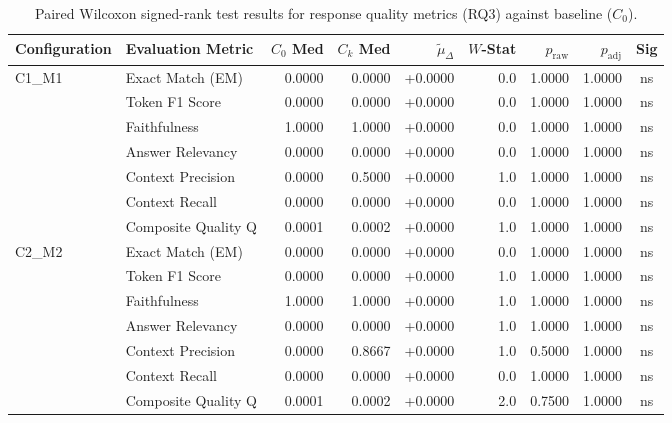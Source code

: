 \begin{table}[p]
\centering
\scriptsize
\setlength{\tabcolsep}{2.4pt}
\renewcommand{\arraystretch}{0.92}
\caption{Paired Wilcoxon signed-rank test results for response quality metrics (RQ3) against baseline ($C_0$).}
\label{tab:wilcoxon_rq3}
\begin{tabular*}{\textwidth}{@{\extracolsep{\fill}} l l r r r r r r c @{}}
\toprule
\textbf{Configuration} & \textbf{Evaluation Metric} & \textbf{$C_0$ Med} & \textbf{$C_k$ Med} & \textbf{$\tilde{\mu}_\Delta$} & \textbf{$W$-Stat} & \textbf{$p_{\text{raw}}$} & \textbf{$p_{\text{adj}}$} & \textbf{Sig} \\
\midrule
C1\_M1          & Exact Match (EM)     & 0.0000 & 0.0000 & +0.0000 & 0.0 & 1.0000 & 1.0000 & ns \\
                & Token F1 Score       & 0.0000 & 0.0000 & +0.0000 & 0.0 & 1.0000 & 1.0000 & ns \\
                & Faithfulness         & 1.0000 & 1.0000 & +0.0000 & 0.0 & 1.0000 & 1.0000 & ns \\
                & Answer Relevancy     & 0.0000 & 0.0000 & +0.0000 & 0.0 & 1.0000 & 1.0000 & ns \\
                & Context Precision    & 0.0000 & 0.5000 & +0.0000 & 1.0 & 1.0000 & 1.0000 & ns \\
                & Context Recall       & 0.0000 & 0.0000 & +0.0000 & 0.0 & 1.0000 & 1.0000 & ns \\
                & Composite Quality Q  & 0.0001 & 0.0002 & +0.0000 & 1.0 & 1.0000 & 1.0000 & ns \\
\addlinespace
C2\_M2          & Exact Match (EM)     & 0.0000 & 0.0000 & +0.0000 & 0.0 & 1.0000 & 1.0000 & ns \\
                & Token F1 Score       & 0.0000 & 0.0000 & +0.0000 & 1.0 & 1.0000 & 1.0000 & ns \\
                & Faithfulness         & 1.0000 & 1.0000 & +0.0000 & 1.0 & 1.0000 & 1.0000 & ns \\
                & Answer Relevancy     & 0.0000 & 0.0000 & +0.0000 & 1.0 & 1.0000 & 1.0000 & ns \\
                & Context Precision    & 0.0000 & 0.8667 & +0.0000 & 1.0 & 0.5000 & 1.0000 & ns \\
                & Context Recall       & 0.0000 & 0.0000 & +0.0000 & 0.0 & 1.0000 & 1.0000 & ns \\
                & Composite Quality Q  & 0.0001 & 0.0002 & +0.0000 & 2.0 & 0.7500 & 1.0000 & ns \\

\end{tabular*}
\end{table}
